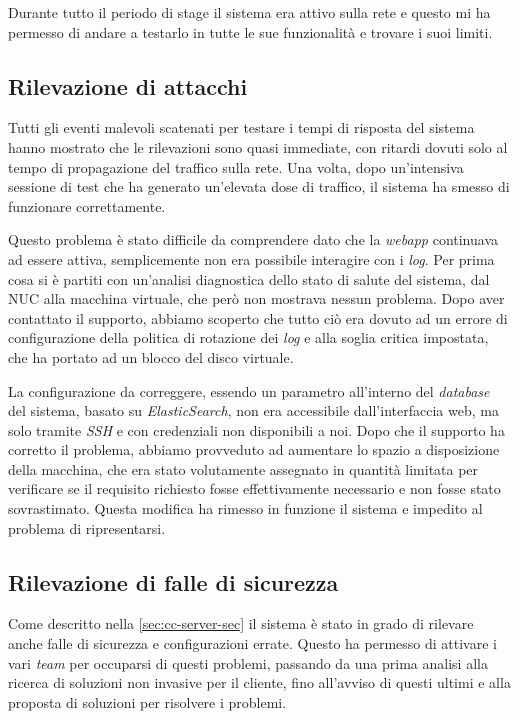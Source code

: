 Durante tutto il periodo di stage il sistema era attivo sulla rete e questo mi ha permesso di andare a testarlo in tutte le sue funzionalità e trovare i suoi limiti.

\subsection{Rilevazione di attacchi}

Tutti gli eventi malevoli scatenati per testare i tempi di risposta del sistema hanno mostrato che le rilevazioni sono quasi immediate, con ritardi dovuti solo al tempo di propagazione del traffico sulla rete. Una volta, dopo un'intensiva sessione di test che ha generato un'elevata dose di traffico, il sistema ha smesso di funzionare correttamente.

Questo problema è stato difficile da comprendere dato che la \emph{webapp} continuava ad essere attiva, semplicemente non era possibile interagire con i \emph{log}. Per prima cosa si è partiti con un'analisi diagnostica dello stato di salute del sistema, dal NUC alla macchina virtuale, che però non mostrava nessun problema. Dopo aver contattato il supporto, abbiamo scoperto che tutto ciò era dovuto ad un errore di configurazione della politica di rotazione dei \emph{log} e alla soglia critica impostata, che ha portato ad un blocco del disco virtuale.

La configurazione da correggere, essendo un parametro all'interno del \emph{database} del sistema, basato su \emph{ElasticSearch}, non era accessibile dall'interfaccia web, ma solo tramite \emph{SSH} e con credenziali non disponibili a noi. Dopo che il supporto ha corretto il problema, abbiamo provveduto ad aumentare lo spazio a disposizione della macchina, che era stato volutamente assegnato in quantità limitata per verificare se il requisito richiesto fosse effettivamente necessario e non fosse stato sovrastimato. Questa modifica ha rimesso in funzione il sistema e impedito al problema di ripresentarsi.

\subsection{Rilevazione di falle di sicurezza}

Come descritto nella \autoref{sec:cc-server-sec} il sistema è stato in grado di rilevare anche falle di sicurezza e configurazioni errate. Questo ha permesso di attivare i vari \emph{team} per occuparsi di questi problemi, passando da una prima analisi alla ricerca di soluzioni non invasive per il cliente, fino all'avviso di questi ultimi e alla proposta di soluzioni per risolvere i problemi.

